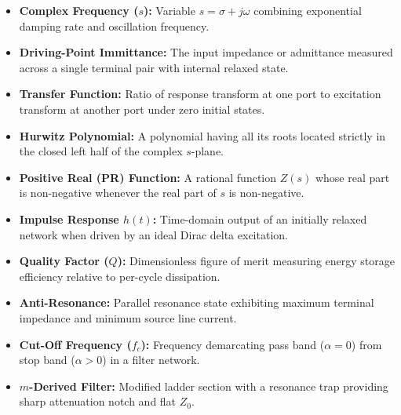 \documentclass[12pt,a4paper]{article}
\begin{document}
\begin{tcolorbox}[defbox, top=5pt, bottom=5pt, title={\textbf{One-Line Definitions}}]
\begin{itemize}[leftmargin=*, itemsep=1.0pt, topsep=0pt]
  \item \textbf{Complex Frequency ($s$):} Variable $s = \sigma + j\omega$ combining exponential damping rate and oscillation frequency.
  \item \textbf{Driving-Point Immittance:} The input impedance or admittance measured across a single terminal pair with internal relaxed state.
  \item \textbf{Transfer Function:} Ratio of response transform at one port to excitation transform at another port under zero initial states.
  \item \textbf{Hurwitz Polynomial:} A polynomial having all its roots located strictly in the closed left half of the complex $s$-plane.
  \item \textbf{Positive Real (PR) Function:} A rational function $Z(s)$ whose real part is non-negative whenever the real part of $s$ is non-negative.
  \item \textbf{Impulse Response $h(t)$:} Time-domain output of an initially relaxed network when driven by an ideal Dirac delta excitation.
  \item \textbf{Quality Factor ($Q$):} Dimensionless figure of merit measuring energy storage efficiency relative to per-cycle dissipation.
  \item \textbf{Anti-Resonance:} Parallel resonance state exhibiting maximum terminal impedance and minimum source line current.
  \item \textbf{Cut-Off Frequency ($f_c$):} Frequency demarcating pass band ($\alpha = 0$) from stop band ($\alpha > 0$) in a filter network.
  \item \textbf{$m$-Derived Filter:} Modified ladder section with a resonance trap providing sharp attenuation notch and flat $Z_0$.
\end{itemize}
\end{tcolorbox}

\newpage
\end{document}
